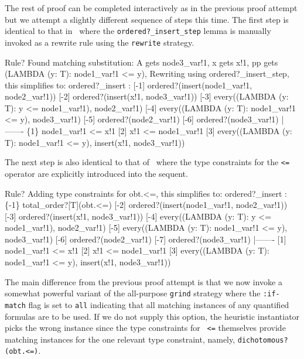 \documentclass[11pt,twoside]{book}
\newcommand{\pvsref}[1]{\fbox{\footnotesize\ref{#1}}} \def\id#1{\hbox{\textt{#1}}} %
\begin{document}
The rest of proof can be completed interactively as in the previous proof
attempt but we attempt 
a slightly different sequence of steps this time.  The first step is identical
to that in~\pvsref{2.2.proof.1} where the \texttt{ordered?\_insert\_step}
lemma is manually invoked as a rewrite rule using the \texttt{rewrite}
strategy.  
\begin{session*}
Rule? 
Found matching substitution:
A gets node3_var!1,
x gets x!1,
pp gets (LAMBDA (y: T): node1_var!1 <= y),
Rewriting using ordered?_insert_step,
this simplifies to: 
ordered?_insert :  
[-1]   ordered?(insert(node1_var!1, node2_var!1))
[-2]   ordered?(insert(x!1, node3_var!1))
[-3]   every((LAMBDA (y: T): y <= node1_var!1), node2_var!1)
[-4]   every((LAMBDA (y: T): node1_var!1 <= y), node3_var!1)
[-5]   ordered?(node2_var!1)
[-6]   ordered?(node3_var!1)
  |-------
\{1\}   node1_var!1 <= x!1
[2]   x!1 <= node1_var!1
[3]   every((LAMBDA (y: T): node1_var!1 <= y), insert(x!1, node3_var!1))
\end{session*}
The next step is also identical to that of~\pvsref{2.2.proof.2}
where the type constraints for  the \texttt{<=} operator are explicitly
introduced into the sequent.
\begin{session*}
Rule? 
Adding type constraints for  obt.<=,
this simplifies to: 
ordered?_insert :  
\{-1\}   total_order?[T](obt.<=)
[-2]   ordered?(insert(node1_var!1, node2_var!1))
[-3]   ordered?(insert(x!1, node3_var!1))
[-4]   every((LAMBDA (y: T): y <= node1_var!1), node2_var!1)
[-5]   every((LAMBDA (y: T): node1_var!1 <= y), node3_var!1)
[-6]   ordered?(node2_var!1)
[-7]   ordered?(node3_var!1)
  |-------
[1]   node1_var!1 <= x!1
[2]   x!1 <= node1_var!1
[3]   every((LAMBDA (y: T): node1_var!1 <= y), insert(x!1, node3_var!1))
\end{session*}
The main difference from the previous proof attempt is that we now invoke
a somewhat powerful variant of the all-purpose \texttt{grind} strategy where
the \texttt{:if-match} flag is set to \texttt{all} indicating that all matching
instances of any quantified formulas are to be used.  If we do not supply
this option, the heuristic instantiator picks the wrong instance since
the type constraints for \texttt{ <=} themselves provide matching instances
for the one relevant type constraint, namely, \texttt{dichotomous?(obt.<=)}.
\end{document}
